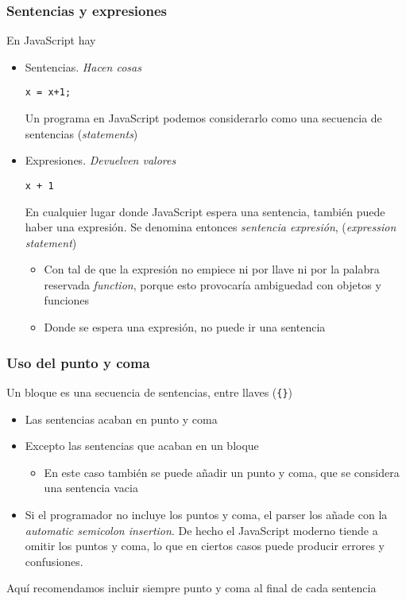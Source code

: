 \documentclass[ucs]{beamer}
\begin{document}
\begin{frame}[fragile]
\frametitle{Sentencias y expresiones}


En JavaScript hay
\begin{itemize}
\item
Sentencias. \emph{Hacen cosas}

\verb|x = x+1;|

Un programa en JavaScript podemos considerarlo como una
secuencia de sentencias (\emph{statements})

\item
Expresiones. \emph{Devuelven valores}

\verb|x + 1|

En cualquier lugar donde JavaScript espera una sentencia, también puede haber una expresión.
Se denomina entonces \emph{sentencia expresión},
(\emph{expression statement})
    \begin{itemize}
    \item
Con tal de que la expresión no empiece ni por llave ni por la
palabra reservada \emph{function}, porque esto provocaría
ambiguedad con objetos y funciones
    \item
Donde se espera una expresión, no puede ir una sentencia
    \end{itemize}
\end{itemize}

\end{frame}

\begin{frame}[fragile]
\frametitle{Uso del punto y coma}
Un bloque es una secuencia de sentencias, entre llaves (\verb|{}|)

    \begin{itemize}
    \item
Las sentencias acaban en punto y coma
    \item
Excepto las sentencias que acaban en un bloque

    \begin{itemize}
    \item
 En este caso también se
puede añadir un punto y coma, que se considera una sentencia vacia
    \end{itemize}

    \item

Si el programador no incluye los puntos y coma, el parser los añade con la
\emph{automatic semicolon insertion}. De hecho el JavaScript moderno tiende
a omitir los puntos y coma, lo que en ciertos casos puede producir errores
y confusiones.
    \end{itemize}
Aquí recomendamos incluir siempre punto y coma al final de cada sentencia

\end{frame}
\end{document}
